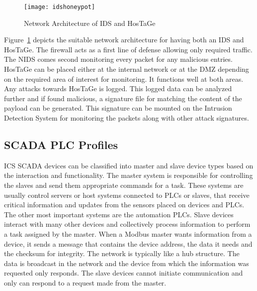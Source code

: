 \documentclass[article,msc=informatik,type=msc,colorback,accentcolor=tud9c]{tudthesis}
\begin{document}
  
   \begin{figure}[h]
            \centering
            \texttt{[image: idshoneypot]}
            \caption[Network Architecture of IDS and HosTaGe]{\label{f:Network Architecture of IDS and HosTaGe}Network Architecture of IDS and HosTaGe}
            \end{figure} 
  
  
  Figure~\ref{f:Network Architecture of IDS and HosTaGe} depicts the suitable network architecture for having both an IDS and HosTaGe. The firewall acts as a first line of defense allowing only required traffic. The \ac{NIDS} comes second monitoring every packet for any malicious entries. HosTaGe can be placed either at the internal network or at the DMZ depending on the required area of interest for monitoring. It functions well at both areas. Any attacks towards HosTaGe is logged. This logged data can be analyzed further and if found malicious, a signature file for matching the content of the payload can be generated. This signature can be mounted on the Intrusion Detection System for monitoring the packets along with other attack signatures.  
  
  
	
	
	\vspace{5mm} 
	\subsection{SCADA PLC Profiles}\label{SCADA PLC Profiles}

	\ac{ICS} \ac{SCADA} devices can be classified into master and slave device types based on the interaction and functionality. The master system is responsible for controlling the slaves and send them appropriate commands for a task. These systems are usually control servers or host systems connected to \ac{PLC}s or slaves, that receive critical information and updates from the sensors placed on devices and \ac{PLC}s. The other most important systems are the automation \ac{PLC}s. Slave devices interact with many other devices and collectively process information to perform a task assigned by the master. When a Modbus master wants information from a device, it sends a message that contains the device address, the data it needs and the checksum for integrity. The network is typically like a hub structure. The data is broadcast in the network and the device from which the information was requested only responds. The slave devices cannot initiate communication and only can respond to a request made from the master. 
	
\end{document}
